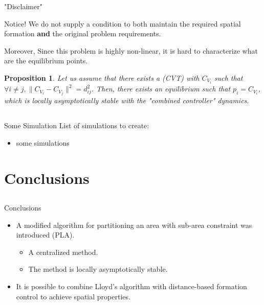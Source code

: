 \documentclass[t]{beamer}
\newcommand{\norm}[1]{\lVert #1 \rVert}
\newtheorem*{Proposition}{Proposition}
\begin{document}
\begin{frame}[label=lloydsandformation3]{"Disclaimer"}
\begin{alertblock}{Notice!}
We do not supply a condition to both maintain the required spatial formation \textbf{and} the original problem requirements.
\end{alertblock}

Moreover, Since this problem is highly non-linear, it is hard to characterize what are the equilibrium points.
\pause
\begin{Proposition}
Let us assume that there exists a (CVT) with $C_{V_{i}}$ such that $\forall i \neq j, \norm{C_{V_{i}} - C_{V_{j}}}^{2} = d_{ij}^{2}$. Then, there exists an equilibrium such that $p_{i} = C_{V_{i}}$, which is locally asymptotically stable with the "combined controller" dynamics.
\end{Proposition}
\end{frame}
\subsection[Simulations]{}
\begin{frame}[label=sl3]{Some Simulation}
List of simulations to create:
\begin{itemize}
\item some simulations
\end{itemize}
\end{frame}


\section[Conclusions]{Conclusions}
\subsection[Conclusions]{}
\begin{frame}[label=conclusions]{Conclusions}
\begin{itemize}
\item A modified algorithm for partitioning an area with sub-area constraint was introduced (PLA).
\begin{itemize}
\item A centralized method.
\item The method is locally asymptotically stable.
\end{itemize}
\item It is possible to combine Lloyd's algorithm with distance-based formation control to achieve spatial properties.
\end{itemize}
\end{frame}
\end{document}
